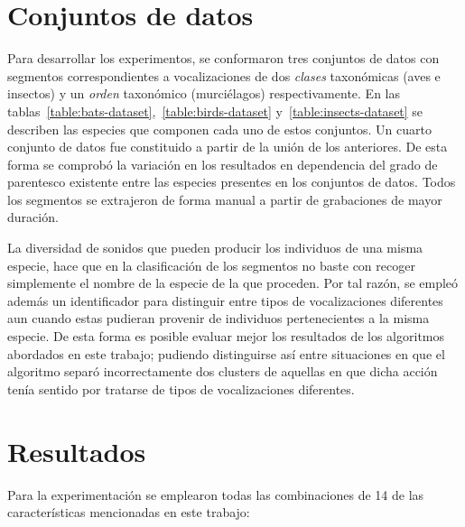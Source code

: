 \section{Conjuntos de datos}\label{sec:datasets}

Para desarrollar los experimentos, se conformaron tres conjuntos de datos con segmentos correspondientes a vocalizaciones de dos \textit{clases} taxonómicas (aves e insectos) y un \textit{orden} taxonómico (murciélagos) respectivamente.
En las tablas~\ref{table:bats-dataset},~\ref{table:birds-dataset} y~\ref{table:insects-dataset} se describen las especies que componen cada uno de estos conjuntos.
Un cuarto conjunto de datos fue constituido a partir de la unión de los anteriores.
De esta forma se comprobó la variación en los resultados en dependencia del grado de parentesco existente entre las especies presentes en los conjuntos de datos.
Todos los segmentos se extrajeron de forma manual a partir de grabaciones de mayor duración.

La diversidad de sonidos que pueden producir los individuos de una misma especie, hace que en la clasificación de los segmentos no baste con recoger simplemente el nombre de la especie de la que proceden.
Por tal razón, se empleó además un identificador para distinguir entre tipos de vocalizaciones diferentes aun cuando estas pudieran provenir de individuos pertenecientes a la misma especie.
De esta forma es posible evaluar mejor los resultados de los algoritmos abordados en este trabajo;
pudiendo distinguirse así entre situaciones en que el algoritmo separó incorrectamente dos clusters de aquellas en que dicha acción tenía sentido por tratarse de tipos de vocalizaciones diferentes.

\section{Resultados}\label{sec:results}

Para la experimentación se emplearon todas las combinaciones de 14 de las características mencionadas en este trabajo:

